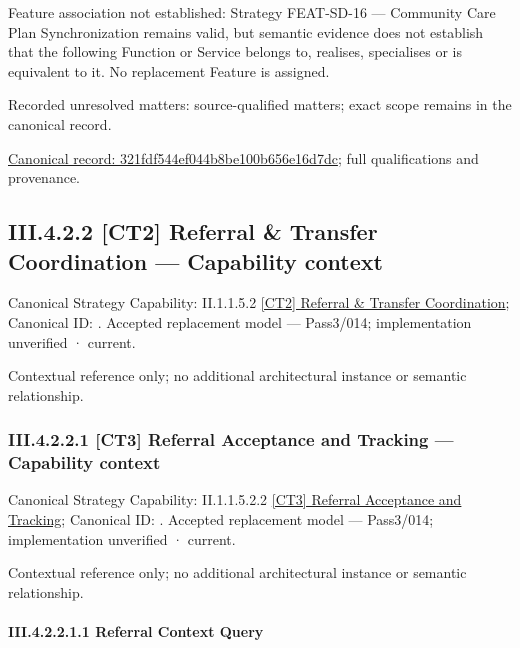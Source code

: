 Feature association not established: Strategy FEAT-SD-16 — Community Care Plan Synchronization remains valid, but semantic evidence does not establish that the following Function or Service belongs to, realises, specialises or is equivalent to it. No replacement Feature is assigned.


{\small Recorded unresolved matters: source-qualified matters; exact scope remains in the canonical record.}\par
{\footnotesize \href{../../../../../../../../continuum/business/business-function/321fdf544ef044b8be100b656e16d7dc.md}{Canonical record: 321fdf544ef044b8be100b656e16d7dc}; full qualifications and provenance.}\par
\subsection*{III.4.2.2 [CT2] Referral \& Transfer Coordination — Capability context}
\label{navigation:III.4.2.2}

{\small Canonical Strategy Capability: II.1.1.5.2 \hyperref[element:47058f45b99b4da7917937ff2382db0f]{[CT2] Referral \& Transfer Coordination}; Canonical ID: \texttt{}. Accepted replacement model — Pass3/014; implementation unverified · current.}\par
Contextual reference only; no additional architectural instance or semantic relationship.\par
\subsubsection*{III.4.2.2.1 [CT3] Referral Acceptance and Tracking — Capability context}
\label{navigation:III.4.2.2.1}

{\small Canonical Strategy Capability: II.1.1.5.2.2 \hyperref[element:2e80c92b0a8b49c698d49ffc5b84e922]{[CT3] Referral Acceptance and Tracking}; Canonical ID: \texttt{}. Accepted replacement model — Pass3/014; implementation unverified · current.}\par
Contextual reference only; no additional architectural instance or semantic relationship.\par
\paragraph*{III.4.2.2.1.1 Referral Context Query}
\label{navigation:III.4.2.2.1.1}

